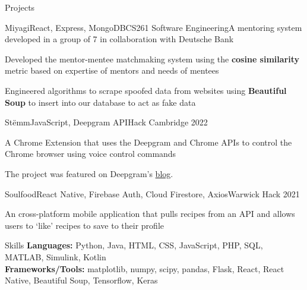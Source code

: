 \documentclass{resume}
\begin{document}
    
    \begin{rSection}{Projects}
        \begin{rSubsection}{Miyagi}{React, Express, MongoDB}{CS261 Software Engineering}{}{A mentoring system developed in a group of 7 in collaboration with Deutsche Bank}
            \item Developed the mentor-mentee matchmaking system using the \textbf{cosine similarity} metric based on expertise of mentors and needs of mentees
            \item Engineered algorithms to scrape spoofed data from websites using \textbf{Beautiful Soup} to insert into our database to act as fake data
        \end{rSubsection}
        \begin{rSubsection}{Stëmm}{JavaScript, Deepgram API}{Hack Cambridge 2022}{}{}
            \item A Chrome Extension that uses the Deepgram and Chrome APIs to control the Chrome browser using voice control commands
            \item The project was featured on Deepgram's \href{https://developers.deepgram.com/blog/2022/03/voice-control-browser-stemm/}{blog}. 
        \end{rSubsection}
        \begin{rSubsection}{Soulfood}{React Native, Firebase Auth, Cloud Firestore, Axios}{Warwick Hack 2021}{}{}
            \item An cross-platform mobile application that pulls recipes from an API and allows users to `like' recipes to save to their profile
        \end{rSubsection}
    \end{rSection}
    \begin{rSection}{Skills}
        \textbf{Languages:} Python, Java, HTML, CSS, JavaScript, PHP, SQL, MATLAB, Simulink, Kotlin\\
        \textbf{Frameworks/Tools:} matplotlib, numpy, scipy, pandas, Flask, React, React Native, Beautiful Soup, Tensorflow, Keras \\ 
    \end{rSection}
\end{document}
